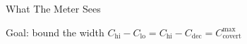 \documentclass[aspectratio=169]{beamer}
\begin{document}
\begin{frame}{What The Meter Sees}
{\begin{tikzpicture}[>=Stealth, line join=round, line cap=round]
	\end{tikzpicture}%
	}

	\vspace{1mm}
	\centering
	\alert{Goal}: bound the width $C_{\mathrm{hi}} - C_{\mathrm{lo}} = C_{\mathrm{hi}} - C_{\mathrm{dec}} = C_{\mathrm{covert}}^{\mathrm{max}}$
\end{frame}


\end{document}

